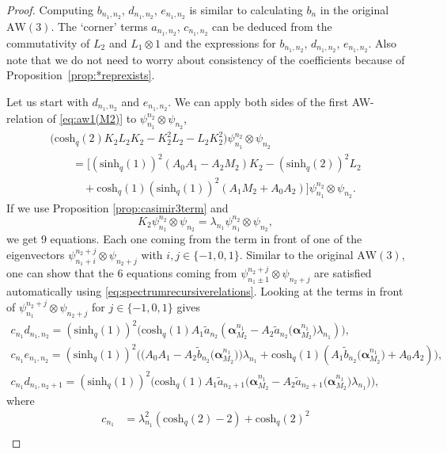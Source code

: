 \documentclass[10pt,a4paper]{amsart}
\numberwithin{equation}{section}
\newcommand{\aw}{\mathrm{AW}\!\left(3\right)}
\newcommand{\chq}{\mathrm{cosh}_q}
\newcommand{\shq}{\mathrm{sinh}_q}
\begin{document}
\begin{proof}
	Computing $b_{n_1,n_2}$, $d_{n_1,n_2}$, $e_{n_1,n_2}$ is similar to calculating $b_n$ in the original~$\aw$. The `corner' terms $a_{n_1,n_2}$, $c_{n_1,n_2}$ can be deduced from the commutativity of $L_2$ and $L_1\otimes 1$ and the expressions for $b_{n_1,n_2}$, $d_{n_1,n_2}$, $e_{n_1,n_2}$. Also note that we do not need to worry about consistency of the coefficients because of Proposition~\ref{prop:*reprexists}.
	
Let us start with $d_{n_1,n_2}$ and $e_{n_1,n_2}$. We can apply both sides of the first AW-relation of \eqref{eq:aw1(M2)} to $\psi_{n_1}^{n_2}\otimes \psi_{n_2}$,
	\begin{gather*}
\big(\chq(2) K_2L_2K_2 - K_2^2L_2 -L_2K_2^2\big) \psi_{n_1}^{n_2}\otimes \psi_{n_2}\\
		\qquad{} = \big[(\shq(1))^2(A_0A_1 -A_2M_2)K_2 -(\shq(2))^2 L_2 \\
		\qquad\quad{} + \chq(1)(\shq(1))^2(A_1M_2+A_0A_2)\big]\psi_{n_1}^{n_2}\otimes \psi_{n_2}.
	\end{gather*}
	If we use Proposition \ref{prop:casimir3term} and
	\[
	K_2\psi_{n_1}^{n_2}\otimes \psi_{n_2}=\lambda_{n_1}\psi_{n_1}^{n_2}\otimes \psi_{n_2},
	\]
	we get 9 equations. Each one coming from the term in front of one of the eigenvectors $\psi_{n_1+i}^{n_2+j}\otimes \psi_{n_2+j}$ with $i,j\in\{-1,0,1\}$. Similar to the original $\aw$, one can show that the $6$ equations coming from $\psi_{n_1\pm 1}^{n_2+j}\otimes \psi_{n_2+j}$ are satisfied automatically using \eqref{eq:spectrumrecursiverelations}. Looking at the terms in front of $\psi_{n_1}^{n_2+j}\otimes \psi_{n_2+j}$ for $j\in\{-1,0,1\}$ gives
	\begin{gather}
		c_{n_1}d_{n_1,n_2} = (\shq(1))^2\big(\chq(1)A_1\tilde{a}_{n_2}(\bm{\alpha}_{M_2}^{n_1}-A_2\tilde{a}_{n_2}\big(\bm{\alpha}_{M_2}^{n_1}\big)\lambda_{n_1} )\big)\label{eq:dn1n2},\\
		c_{n_1}e_{n_1,n_2} = (\shq(1))^2\big(\big(A_0A_1 -A_2\tilde{b}_{n_2}\big(\bm{\alpha}_{M_2}^{n_1}\big)\big)\lambda_{n_1} \! +\chq(1)(A_1\tilde{b}_{n_2}\big(\bm{\alpha}_{M_2}^{n_1}\big)\!+A_0A_2)\big),\label{eq:en1n2}\!\!\!\!\\
		c_{n_1}d_{n_1,n_2+1} = (\shq(1))^2\big(\chq(1)A_1\tilde{a}_{n_2+1}\big(\bm{\alpha}_{M_2}^{n_1}-A_2\tilde{a}_{n_2+1}\big(\bm{\alpha}_{M_2}^{n_1}\big)\lambda_{n_1} \big)\big),\label{eq:dn1n2+1}
	\end{gather}
	where
	\begin{align*}
c_{n_1}& =\lambda_{n_1}^2\left(\chq(2)-2\right)+\chq(2)^2 \\

\end{align*}
\end{proof}
\end{document}
